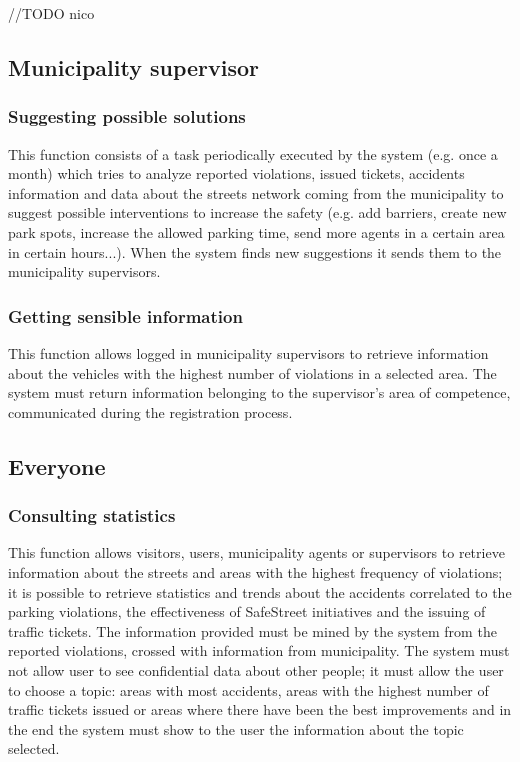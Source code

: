 \documentclass[a4paper]{report}
\begin{document}
//TODO nico 


\subsection{Municipality supervisor}

\subsubsection{Suggesting possible solutions} 
This function consists of a task periodically executed by the system (e.g. once a month) which tries to analyze reported violations, issued tickets, accidents information and data about the streets network coming from the municipality to suggest possible interventions to increase the safety (e.g. add barriers, create new park spots, increase the allowed parking time, send more agents in a certain area in certain hours...). When the system finds new suggestions it sends them to the municipality supervisors.

\subsubsection{Getting sensible information}
This function allows logged in municipality supervisors to retrieve information about the vehicles with the highest number of violations in a selected area. The system must return information belonging to the supervisor's area of competence, communicated during the registration process.

\subsection{Everyone} 

\subsubsection{Consulting statistics}
This function allows visitors, users, municipality agents or supervisors to retrieve information about the streets and areas with the highest frequency of violations; it is possible to retrieve statistics and trends about the accidents correlated to the parking violations, the effectiveness of SafeStreet initiatives and the issuing of traffic tickets. The information provided must be mined by the system from the reported violations, crossed with information from municipality. The system must not allow user to see confidential data about other people; it must allow the user to choose a topic: areas with most accidents, areas with the highest number of traffic tickets issued or areas where there have been the best improvements and in the end the system must show to the user the information about the topic selected.
\end{document}
